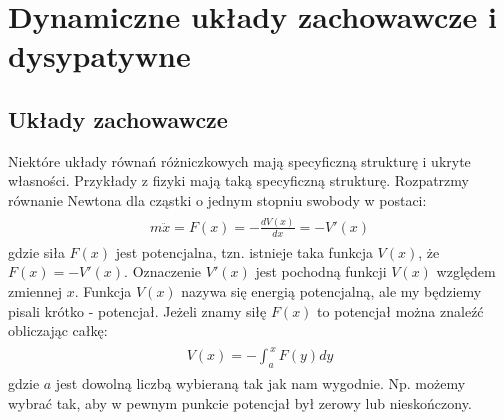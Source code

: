 \documentclass[a4paper,12pt,polish]{sphinxmanual}
\begin{document}
\section{Dynamiczne układy zachowawcze i dysypatywne}
\label{ch1/chI022::doc}\label{ch1/chI022:dynamiczne-uklady-zachowawcze-i-dysypatywne}

\subsection{Układy zachowawcze}
\label{ch1/chI022:uklady-zachowawcze}
Niektóre układy równań różniczkowych mają specyficzną strukturę i ukryte własności. Przykłady z fizyki mają taką specyficzną strukturę. Rozpatrzmy równanie Newtona dla cząstki o jednym stopniu swobody w postaci:
\label{ch1/chI022:equation-eqn1}\begin{gather}
\begin{split}m\ddot x = F(x) = -\frac{dV(x)}{dx} = - V'(x)\end{split}\label{ch1/chI022-eqn1}
\end{gather}
gdzie siła $F(x)$ jest potencjalna, tzn.  istnieje taka funkcja $V(x)$, że $F(x) = -V'(x)$.  Oznaczenie $V'(x)$ jest pochodną funkcji $V(x)$ względem zmiennej $x$. Funkcja  $V(x)$ nazywa się energią potencjalną, ale my będziemy pisali krótko - potencjał. Jeżeli znamy siłę $F(x)$ to potencjał można znaleźć obliczając całkę:
\label{ch1/chI022:equation-eqn2}\begin{gather}
\begin{split}V(x) = - \int_a^{\,x}  F(y) dy\end{split}\label{ch1/chI022-eqn2}
\end{gather}
gdzie $a$ jest dowolną liczbą wybieraną tak jak nam wygodnie. Np. możemy wybrać tak, aby w pewnym punkcie potencjał był zerowy lub nieskończony.
\end{document}
